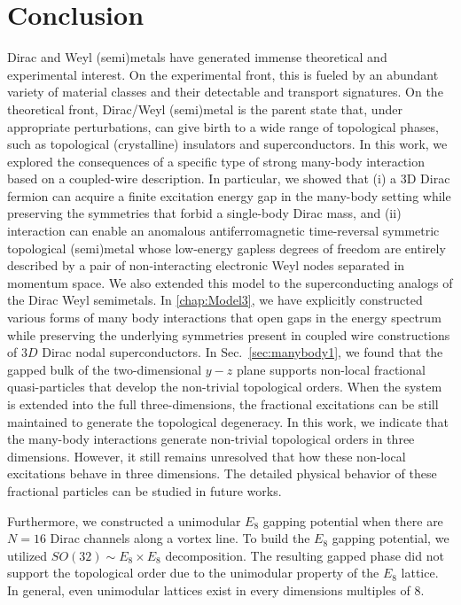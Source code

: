 \chapter{Conclusion}\label{chap:Conclusion}

Dirac and Weyl (semi)metals have generated immense theoretical and experimental interest. On the experimental front, this is fueled by an abundant variety of material classes and their detectable \ARPES and transport signatures. On the theoretical front, Dirac/Weyl (semi)metal is the parent state that, under appropriate perturbations, can give birth to a wide range of topological phases, such as topological (crystalline) insulators and superconductors. In this work, we explored the consequences of a specific type of strong many-body interaction based on a coupled-wire description. In particular, we showed that (i) a 3D Dirac fermion can acquire a finite excitation energy gap in the many-body setting while preserving the symmetries that forbid a single-body Dirac mass, and (ii) interaction can enable an anomalous antiferromagnetic time-reversal symmetric topological (semi)metal whose low-energy gapless degrees of freedom are entirely described by a pair of non-interacting electronic Weyl nodes separated in momentum space. We also extended this model to the superconducting analogs of the Dirac Weyl semimetals. In \ref{chap:Model3}, we have explicitly constructed various forms of many body interactions that open gaps in the energy spectrum while preserving the underlying symmetries present in coupled wire constructions of $3D$ Dirac nodal superconductors. In Sec.~\ref{sec:manybody1}, we found that the gapped bulk of the two-dimensional $y-z$ plane supports non-local fractional quasi-particles that develop the non-trivial topological orders. When the system is extended into the full three-dimensions, the fractional excitations can be still maintained to generate the topological degeneracy. In this work, we indicate that the many-body interactions generate non-trivial topological orders in three dimensions. However, it still remains unresolved that how these non-local excitations behave in three dimensions. The detailed physical behavior of these fractional particles can be studied in future works.

Furthermore, we constructed a unimodular $E_8$ gapping potential when there are $N=16$ Dirac channels along a vortex line. To build the $E_8$ gapping potential, we utilized $SO(32)\sim E_8 \times E_8$ decomposition. The resulting gapped phase did not support the topological order due to the unimodular property of the $E_8$ lattice. In general, even unimodular lattices exist in every dimensions multiples of $8$. 


